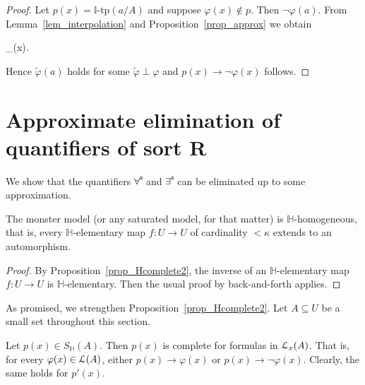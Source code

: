 \documentclass[10pt,oneside]{amsproc}
\begin{document}
 \begin{proof}
  Let $p(x)=\mathds{I}\mbox{-tp}(a/A)$ and suppose $\varphi(x)\notin p$.
  Then $\neg\varphi(a)$.
  From Lemma~\ref{lem_interpolation} and Proposition~\ref{prop_approx} we obtain

  {\rightarrow}
  {\bigvee_{\tilde{\varphi}\perp\varphi}\tilde{\varphi}(x).}

  Hence $\tilde{\varphi}(a)$ holds for some $\tilde{\varphi}\perp\varphi$ and $p(x)\rightarrow\neg\varphi(x)$ follows.
 \end{proof}








\section{Approximate elimination of quantifiers of sort \textsf{R}}

We show that the quantifiers $\forallR $ and $\existsR $ can be eliminated up to some approximation.

\begin{proposition}
  The monster model (or any saturated model, for that matter) is $\mathds{H}$-homogeneous, that is, every $\mathds{H}$-elementary map $f:U\to U$ of cardinality $<\kappa$ extends to an automorphism.
\end{proposition}

\begin{proof}
  By Proposition~\ref{prop_Hcomplete2}, the inverse of an $\mathds{H}$-elementary map $f:U\to U$ is $\mathds{H}$-elementary.
  Then the usual proof by back-and-forth applies.
\end{proof}

As promised, we strengthen Proposition~\ref{prop_Hcomplete2}.
Let $A\subseteq U$ be a small set throughout this section.

\begin{corollary}\label{corol_Lcomplete}
  Let $p(x)\in S_\mathds{H}(A)$.
  Then $p(x)$ is complete for formulas in ${\EuScript L}_x(A)$.
  That is, for every $\varphi(x)\in{\EuScript L}(A)$, either $p(x)\rightarrow\varphi(x)$ or $p(x)\rightarrow\neg\varphi(x)$.
  Clearly, the same holds for $p'(x)$.
\end{corollary}
\end{document}
